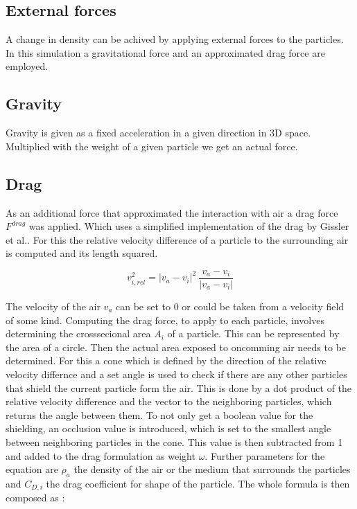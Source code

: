 \documentclass[intern]{cgMA}
\begin{document}
    \subsection{External forces}
    A change in density can be achived by applying external forces to the particles. In this simulation a gravitational force and an approximated drag force are employed.
    \subsection{Gravity}
    Gravity is given as a fixed acceleration in a given direction in 3D space. Multiplied with the weight of a given particle we get an actual force.
    \subsection{Drag}
    As an additional force that approximated the interaction with air a drag force $F^{drag}$ was applied. Which uses a simplified implementation of the drag by Gissler et al.. For this the relative velocity difference of a particle to the surrounding air is computed and its length squared. \cite{10.1016/j.cag.2017.09.002}

    \begin{equation}
        v^2_{i,rel} = |v_a - v_i|^2\ \frac{v_a - v_i}{|v_a - v_i|}
    \end{equation}

    The velocity of the air $v_a$ can be set to 0 or could be taken from a velocity field of some kind. Computing the drag force, to apply to each particle, involves determining the crosssecional area $A_i$ of a particle. This can be represented by the area of a circle. Then the actual area exposed to oncomming air needs to be determined. For this a cone which is defined by the direction of the relative velocity differnce and a set angle is used to check if there are any other particles that shield the current particle form the air. This is done by a dot product of the relative velocity difference and the vector to the neighboring particles, which returns the angle between them. To not only get a boolean value for the shielding, an occlusion value is introduced, which is set to the smallest angle between neighboring particles in the cone. This value is then subtracted from 1 and added to the drag formulation as weight $\omega$. Further parameters for the equation are $\rho_a$ the density of the air or the medium that surrounds the particles and $C_{D,i}$ the drag coefficient for shape of the particle. \cite{10.1016/j.cag.2017.09.002} The whole formula is then composed as : 
\end{document}
